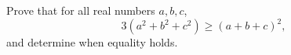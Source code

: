 Prove that for all real numbers $a,b,c$,
\[3\left(a^2+b^2+c^2\right)\ge(a+b+c)^2,\]
and determine when equality holds.
